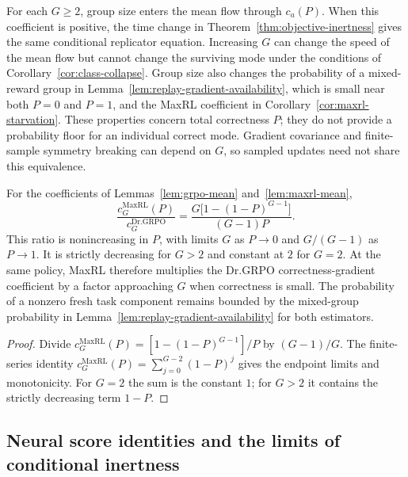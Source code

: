\begin{remark}
\label{rem:group-size-inert}
For each $G\ge2$, group size enters the mean flow through $c_a(P)$.
When this coefficient is positive, the time change in
Theorem~\ref{thm:objective-inertness} gives the same conditional replicator
equation. Increasing $G$ can change the speed of the mean flow but cannot
change the surviving mode under the conditions of
Corollary~\ref{cor:class-collapse}.
Group size also changes the probability of a mixed-reward group in
Lemma~\ref{lem:replay-gradient-availability}, which is small near both
$P=0$ and $P=1$, and the MaxRL coefficient in
Corollary~\ref{cor:maxrl-starvation}. These properties concern total
correctness $P$; they do not provide a probability floor for an individual
correct mode. Gradient covariance and finite-sample symmetry breaking can depend on $G$,
so sampled updates need not share this equivalence.
\end{remark}

\begin{corollary}
\enforcehalffinalproseline
\label{cor:maxrl-starvation}
For the coefficients of Lemmas~\ref{lem:grpo-mean} and~\ref{lem:maxrl-mean},
\[
 \frac{c_G^{\mathrm{MaxRL}}(P)}{c_G^{\mathrm{Dr.GRPO}}}
 =\frac{G\big[1-(1-P)^{G-1}\big]}{(G-1)P}.
\]
This ratio is nonincreasing in $P$, with limits $G$ as $P\to0$ and
$G/(G-1)$ as $P\to1$. It is strictly decreasing for $G>2$ and constant
at $2$ for $G=2$. At the same policy, MaxRL therefore multiplies the
Dr.GRPO correctness-gradient coefficient by a factor approaching $G$ when
correctness is small. The probability of a nonzero fresh task component
remains bounded by the mixed-group probability in
Lemma~\ref{lem:replay-gradient-availability} for both estimators.
\end{corollary}

\begin{proof}
\enforcehalffinalproseline
Divide $c_G^{\mathrm{MaxRL}}(P)=[1-(1-P)^{G-1}]/P$ by $(G-1)/G$.
The finite-series identity
$c_G^{\mathrm{MaxRL}}(P)=\sum_{j=0}^{G-2}(1-P)^j$
gives the endpoint limits and monotonicity. For $G=2$ the sum is the
constant $1$; for $G>2$ it contains the strictly decreasing term $1-P$.
\end{proof}

\subsection{Neural score identities and the limits of conditional inertness}
\label{app:neural-binary-inertness}

